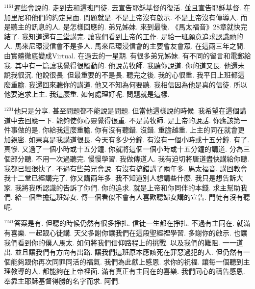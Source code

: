 \documentclass{book}
\begin{document}
$^{1161}$遲些會說的.
走到去和這班門徒.
去宣告耶穌基督的復活.
並且宣告耶穌基督.
在加里尼和他們的約定見面.
問題就是.
不是上帝沒有啟示.
不是上帝沒有傳導人.
而是聽主的訊息的人.
是怎樣回應的.
弟兄姊妹.
來到最後.
《馬太福音》28章就快完結了.
我知道還有三堂講完.
讓我們看到上帝的工作.
是給一班願意追求認識祂的人.
馬來尼環浸信會不是多人.
馬來尼環浸信會的主要會友會眾.
在這兩三年之間.
由實體徹底變成Virtual.
在過去的一星期.
有很多弟兄姊妹.
有不同的留言和電郵給我.
其中有一篇讓我覺得很觸動的.
他說黃牧師.
我聽你說道.
你的道又長.
他還未說我很沉.
他說很長.
但最重要的不是長.
聽完之後.
我的心很重.
我平日上班都這麼重膽.
我還回來聽你的講道.
他又不知為何要聽.
我相信因為他是真的信徒.
所以他要追求上主.
我這麼重.
如何處理好呢.
問題就是這樣.

$^{1201}$他只是分享.
甚至問題都不能說是問題.
但當他這樣說的時候.
我希望在這個講道中去回應一下.
能夠使你心靈覺得很重.
不是黃牧師.
是上帝的說話.
你應該第一件事做的是.
你給我這麼重膽.
你有沒有聽錯.
沒錯.
重膽越重.
上主的同在就會更加親密.
如果真是我講道很長.
今天有多少分鐘.
有沒有一個小時或十五分鐘.
有了.
真慘.
又過了一個小時或十五分鐘.
你就將這個一個小時或十五分鐘的講道.
分為三個部分聽.
不用一次過聽完.
慢慢學習.
我做傳道人.
我有迫切將唐道盡快講給你聽.
我都已經很快了.
不過有些弟兄會說.
有沒有搞錯講了兩年多.
馬太福音.
講回教會我十二堂已經講完了.
你又講兩年多.
我不知道別人想講些什麼.
我只是想告訴大家.
我將我所認識的告訴了你們.
你的追求.
就是上帝和你同伴的本錢.
求主幫助我們.
給一個重擔這班婦女.
傳一個看似不會有人喜歡聽婦女講的宣告.
門徒有沒有聽呢.

$^{1241}$答案是有.
但聽的時候仍然有很多掙扎.
信徒一生都在掙扎.
不過有主同在.
就滿有喜樂.
一起跟心徒講.
天父多謝你讓我們在這段聖經裡學習.
多謝你的啟示.
也讓我們看到你的僕人馬太.
如何將我們信仰路程上的挑戰.
以及我們的難阻.
一一道出.
並且讓我們有方向有出路.
讓我們這班原本應該死在罪惡過犯的人.
但仍然有一個能夠跟你再次同罪同活的福氣.
我們為此獻上感恩.
求你的祝福.
讓每一個聽到主理教導的人.
都能夠在上帝裡面.
滿有真正有主同在的喜樂.
我們同心的禱告感恩.
奉靠主耶穌基督得勝的名字而求.
阿們.
\newpage
\end{document}
